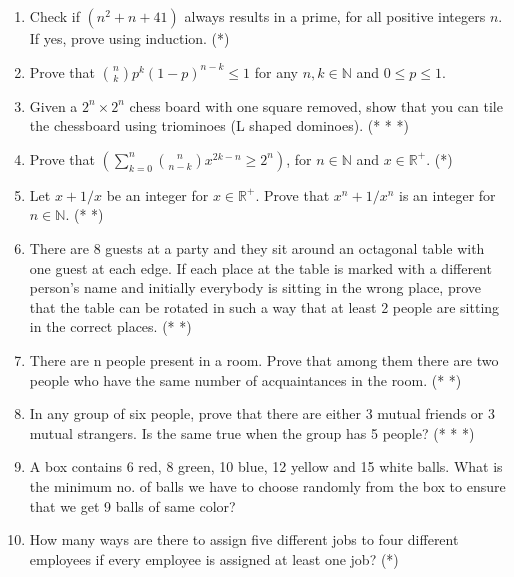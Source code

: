 \documentclass[a4paper]{article}
\begin{document}
\begin{enumerate}
\item Check if $(n^2 +n+41)$ always results in a prime, for all positive integers $n$. If yes, prove using induction. (*)

\item Prove that ${n \choose k} {p^k}(1-p)^{n-k} \leq 1$ for any $n,k \in \mathbb{N}$ and $0 \leq p \leq 1$.

\item Given a $2^n \times 2^n$ chess board with one square removed, show that you can tile the chessboard using triominoes (L shaped dominoes). (* * *)

\item Prove that $\left( \sum_{k=0}^{n} {n \choose {n-k}} x^{2k-n} \geq 2^n \right)$, for $n \in \mathbb{N}$ and $x \in \mathbb{R}^+$. (*)

\item Let $x+ 1/x$ be an integer for $x \in \mathbb{R}^+$. Prove that $x^n+ 1/x^n$ is an integer for $n \in \mathbb{N}$. (* *)

\item There are 8 guests at a party and they sit around an octagonal table with one guest at each edge. If each place at the table is marked with a different person’s name and initially everybody is sitting in the wrong place, prove that the table can be rotated in such a way that at least 2 people are sitting in the correct places. (* *)

\item There are n people present in a room. Prove that among them there are two people who have the same number of acquaintances in the room. (* *)

\item In any group of six people, prove that there are either 3 mutual friends or 3 mutual strangers. Is the same true when the group has 5 people? (* * *)

\item A box contains 6 red, 8 green, 10 blue, 12 yellow and 15 white balls. What is the minimum no. of balls we have to choose randomly from the box to ensure that we get 9 balls of same color?

\item How many ways are there to assign five different jobs to four different employees if every employee is assigned at least one job? (*)


\end{enumerate}
\end{document}
